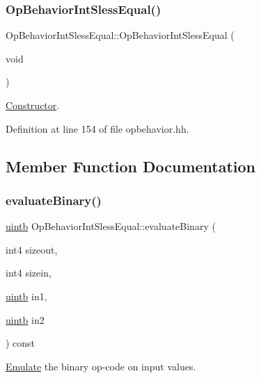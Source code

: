 \subsubsection{\texorpdfstring{OpBehaviorIntSlessEqual()}{OpBehaviorIntSlessEqual()}}
{\footnotesize\ttfamily Op\+Behavior\+Int\+Sless\+Equal\+::\+Op\+Behavior\+Int\+Sless\+Equal (\begin{DoxyParamCaption}\item[{void}]{ }\end{DoxyParamCaption})\hspace{0.3cm}{\ttfamily [inline]}}



\mbox{\hyperlink{class_constructor}{Constructor}}. 



Definition at line 154 of file opbehavior.\+hh.



\subsection{Member Function Documentation}
\mbox{\label{class_op_behavior_int_sless_equal_a15f037e586698f31a78b33ea86bd40c5}} 
\subsubsection{\texorpdfstring{evaluateBinary()}{evaluateBinary()}}
{\footnotesize\ttfamily \mbox{\hyperlink{types_8h_a2db313c5d32a12b01d26ac9b3bca178f}{uintb}} Op\+Behavior\+Int\+Sless\+Equal\+::evaluate\+Binary (\begin{DoxyParamCaption}\item[{int4}]{sizeout,  }\item[{int4}]{sizein,  }\item[{\mbox{\hyperlink{types_8h_a2db313c5d32a12b01d26ac9b3bca178f}{uintb}}}]{in1,  }\item[{\mbox{\hyperlink{types_8h_a2db313c5d32a12b01d26ac9b3bca178f}{uintb}}}]{in2 }\end{DoxyParamCaption}) const\hspace{0.3cm}{\ttfamily [virtual]}}



\mbox{\hyperlink{class_emulate}{Emulate}} the binary op-\/code on input values. 


